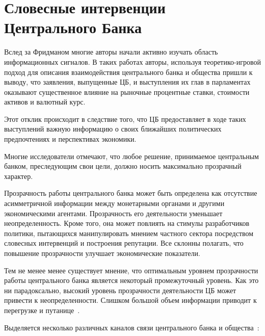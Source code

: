 \documentclass[14pt,a4paper, oneside]{extreport}
\begin{document}
\section{Словесные интервенции Центрального Банка}
Вслед за Фридманом многие авторы начали активно изучать область информационных сигналов. В таких работах авторы, используя теоретико-игровой подход для описания взаимодействия центрального банка и общества пришли к выводу, что заявления, выпущенные ЦБ, и выступления их глав в парламентах оказывают существенное влияние на рыночные процентные ставки, стоимости активов и валютный курс. 

Этот отклик происходит в следствие того, что ЦБ предоставляет в ходе таких выступлений важную информацию о своих ближайших политических предпочтениях и перспективах экономики. 

Многие исследователи отмечают, что любое решение, принимаемое центральным банком, преследующим свои цели, должно носить максимально прозрачный характер.

Прозрачность работы центрального банка может быть определена как отсутствие асимметричной информации между монетарными органами и другими экономическими агентами.  Прозрачность его деятельности уменьшает неопределенность. Кроме того, она может повлиять на стимулы разработчиков политики, пытающихся манипулировать мнением частного сектора посредством словесных интервенций и построения репутации.  Все склонны полагать, что повышение прозрачности улучшает экономические показатели.

Тем не менее менее существует мнение, что оптимальным уровнем прозрачности работы центрального банка является некоторый промежуточный уровень. Как это ни парадоксально, высокий уровень прозрачности деятельности ЦБ может привести к неопределенности.  Слишком большой объем информации приводит к перегрузке и путанице~\cite{morris2005central}.

Выделяется несколько различных каналов связи центрального банка и общества~\cite{kohn2003central}:
\end{document}

